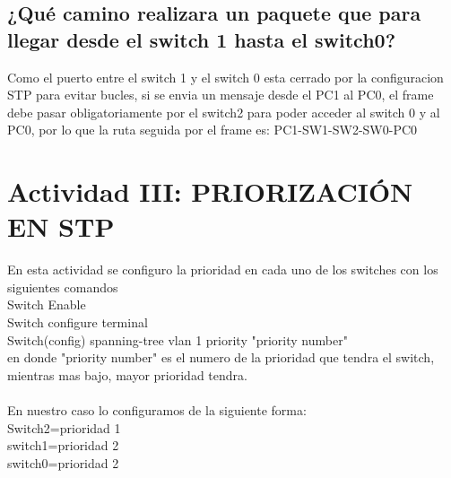 \documentclass[spanish]{udpreport}
\begin{document}
\subsection{¿Qué camino realizara un paquete que para llegar desde el switch 1 hasta el switch0?}
Como el puerto entre el switch 1 y el switch 0 esta cerrado por la configuracion STP para evitar bucles, si se envia un mensaje desde el PC1 al PC0, el frame debe pasar obligatoriamente por el switch2 para poder acceder al switch 0 y al PC0, por lo que la ruta seguida por el frame es: PC1-SW1-SW2-SW0-PC0

\vspace{0.5cm}
\section{Actividad III: PRIORIZACIÓN EN STP}
En esta actividad se configuro la prioridad en cada uno de los switches con los siguientes comandos\\
Switch Enable\\
Switch configure terminal\\
Switch(config) spanning-tree vlan 1 priority "priority number"\\

en donde "priority number" es el numero de la prioridad que tendra el switch, mientras mas bajo, mayor prioridad tendra.\\\\

En nuestro caso lo configuramos de la siguiente forma:\\
Switch2=prioridad 1\\
switch1=prioridad 2\\
switch0=prioridad 2\\

\vspace{0.5cm}
\end{document}
